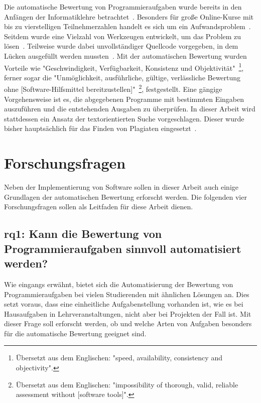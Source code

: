 Die automatische Bewertung von Programmieraufgaben wurde bereits in den Anfängen der Informatiklehre betrachtet~\cite{hollingsworth-1960}.
Besonders für große Online-Kurse mit bis zu vierstelligen Teilnehmerzahlen handelt es sich um ein Aufwandsproblem~\cite{pieterse-2013}.
Seitdem wurde eine Vielzahl von Werkzeugen entwickelt, um das Problem zu lösen~\cite{jackson-1997-assyst,edwards-2008-web-cat,enstroem-et-al-2011,vander-zanden-2012}.
Teilweise wurde dabei unvollständiger Quellcode vorgegeben, in dem Lücken ausgefüllt werden mussten~\cite{vander-zanden-2012}.
Mit der automatischen Bewertung wurden Vorteile wie "Geschwindigkeit, Verfügbarkeit, Konsistenz und Objektivität"~\cite{ala-mutka-2005}\footnote{
    Übersetzt aus dem Englischen: "speed, availability, consistency and objectivity".
}, ferner sogar die "Unmöglichkeit, ausführliche, gültige, verlässliche Bewertung ohne [Software-Hilfsmittel bereitzustellen]"~\cite{kay-1994}\footnote{
    Übersetzt aus dem Englischen: "impossibility of thorough, valid, reliable assessment without [software tools]".
}, festgestellt.
Eine gängige Vorgehensweise ist es, die abgegebenen Programme mit bestimmten Eingaben auszuführen und die entstehenden Ausgaben zu überprüfen.
In dieser Arbeit wird stattdessen ein Ansatz der textorientierten Suche vorgeschlagen.
Dieser wurde bisher hauptsächlich für das Finden von Plagiaten eingesetzt~\cite{aiken-2002,prechelt-2003}.

\section{Forschungsfragen}\label{sec:research-questions}

Neben der Implementierung von Software sollen in dieser Arbeit auch einige Grundlagen der automatischen Bewertung erforscht werden.
Die folgenden vier Forschungsfragen sollen als Leitfaden für diese Arbeit dienen.

\subsection[\acs{rq}1]{\ac{rq}1: Kann die Bewertung von Programmieraufgaben sinnvoll automatisiert werden?}\label{subsec:rq1-useful-automation}

Wie eingangs erwähnt, bietet sich die Automatisierung der Bewertung von Programmieraufgaben bei vielen Studierenden mit ähnlichen Lösungen an.
Dies setzt voraus, dass eine einheitliche Aufgabenstellung vorhanden ist, wie es bei Hausaufgaben in Lehrveranstaltungen, nicht aber bei Projekten der Fall ist.
Mit dieser Frage soll erforscht werden, ob und welche Arten von Aufgaben besonders für die automatische Bewertung geeignet sind.

